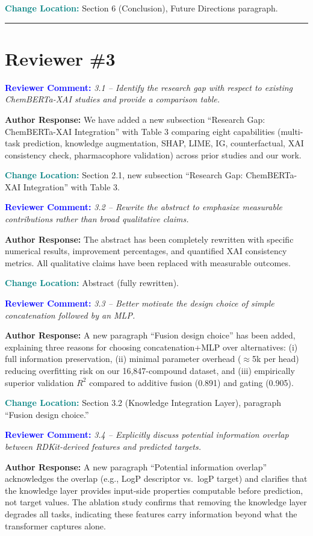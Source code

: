 \documentclass[12pt]{article}
\newcommand{\RC}[1]{\textbf{\textcolor{blue}{Reviewer Comment:}} \textit{#1}\vspace{0.3em}}
\newcommand{\AR}[1]{\textbf{Author Response:} #1\vspace{0.8em}}
\newcommand{\CH}[1]{\textbf{\textcolor{teal}{Change Location:}} #1\vspace{0.5em}}
\begin{document}
\CH{Section 6 (Conclusion), Future Directions paragraph.}

\bigskip
\hrule
\bigskip

\section*{Reviewer \#3}

\RC{3.1 -- Identify the research gap with respect to existing ChemBERTa-XAI studies and provide a comparison table.}

\AR{We have added a new subsection ``Research Gap: ChemBERTa-XAI Integration'' with Table 3 comparing eight capabilities (multi-task prediction, knowledge augmentation, SHAP, LIME, IG, counterfactual, XAI consistency check, pharmacophore validation) across prior studies and our work.}

\CH{Section 2.1, new subsection ``Research Gap: ChemBERTa-XAI Integration'' with Table 3.}

\bigskip

\RC{3.2 -- Rewrite the abstract to emphasize measurable contributions rather than broad qualitative claims.}

\AR{The abstract has been completely rewritten with specific numerical results, improvement percentages, and quantified XAI consistency metrics. All qualitative claims have been replaced with measurable outcomes.}

\CH{Abstract (fully rewritten).}

\bigskip

\RC{3.3 -- Better motivate the design choice of simple concatenation followed by an MLP.}

\AR{A new paragraph ``Fusion design choice'' has been added, explaining three reasons for choosing concatenation+MLP over alternatives: (i) full information preservation, (ii) minimal parameter overhead ($\approx$5k per head) reducing overfitting risk on our 16,847-compound dataset, and (iii) empirically superior validation $R^2$ compared to additive fusion (0.891) and gating (0.905).}

\CH{Section 3.2 (Knowledge Integration Layer), paragraph ``Fusion design choice.''}

\bigskip

\RC{3.4 -- Explicitly discuss potential information overlap between RDKit-derived features and predicted targets.}

\AR{A new paragraph ``Potential information overlap'' acknowledges the overlap (e.g., LogP descriptor vs.\ logP target) and clarifies that the knowledge layer provides input-side properties computable before prediction, not target values. The ablation study confirms that removing the knowledge layer degrades all tasks, indicating these features carry information beyond what the transformer captures alone.}
\end{document}
